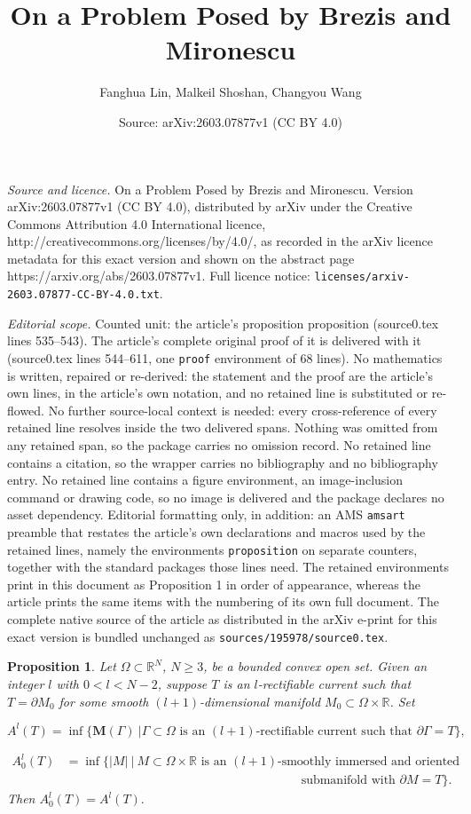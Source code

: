\documentclass[10pt,a4paper]{amsart}
\title{On a Problem Posed by Brezis and Mironescu}
\author{Fanghua Lin, Malkeil Shoshan, Changyou Wang}
\date{Source: arXiv:2603.07877v1 (CC BY 4.0)}
\newtheorem{proposition}{Proposition}
\newcommand{\R}{\mathbb{R}}
\begin{document}
\maketitle

\noindent\emph{Source and licence.} On a Problem Posed by Brezis and Mironescu. Version arXiv:2603.07877v1 (CC BY 4.0), distributed by arXiv under the Creative Commons Attribution 4.0 International licence, http://creativecommons.org/licenses/by/4.0/, as recorded in the arXiv licence metadata for this exact version and shown on the abstract page https://arxiv.org/abs/2603.07877v1. Full licence notice: \texttt{licenses/arxiv-2603.07877-CC-BY-4.0.txt}.\par\smallskip

\noindent\textit{Editorial scope.} Counted unit: the article's proposition proposition (source0.tex lines 535--543). The article's complete original proof of it is delivered with it (source0.tex lines 544--611, one \texttt{proof} environment of 68 lines). No mathematics is written, repaired or re-derived: the statement and the proof are the article's own lines, in the article's own notation, and no retained line is substituted or re-flowed.  No further source-local context is needed: every cross-reference of every retained line resolves inside the two delivered spans.  Nothing was omitted from any retained span, so the package carries no omission record.  No retained line contains a citation, so the wrapper carries no bibliography and no bibliography entry.  No retained line contains a figure environment, an image-inclusion command or drawing code, so no image is delivered and the package declares no asset dependency.  Editorial formatting only, in addition: an AMS \texttt{amsart} preamble that restates the article's own declarations and macros used by the retained lines, namely the environments \texttt{proposition} on separate counters, together with the standard packages those lines need.  The retained environments print in this document as Proposition 1 in order of appearance, whereas the article prints the same items with the numbering of its own full document.  The complete native source of the article as distributed in the arXiv e-print for this exact version is bundled unchanged as \texttt{sources/195978/source0.tex}.
\begin{proposition} {\it Let $\Omega \subset \mathbb{R}^N$, $N\geq 3$, be a bounded convex open set. Given an integer $l$ with $0 < l < N-2$, suppose $T$ is an $l$-rectifiable current such that $T = \partial M_0$ for some smooth $(l+1)$-dimensional manifold $M_0 \subset \Omega\times\R$. Set 

\[ A^l(T) = \inf \Big\{ \mathbf{M}(\Gamma)\ | \Gamma \subset \Omega \text{ is an } (l+1)\text{-rectifiable current such that } \partial \Gamma = T \Big\},\]

\begin{align*} A_0^l(T) &= \inf \Big\{ |M|\ |\ M\subset\Omega\times\R \text{ is an } (l+1)\text{-smoothly immersed and oriented}\\
&\qquad\qquad\qquad\qquad\qquad\qquad\qquad\qquad\qquad\quad \text{submanifold with } \partial M = T \Big\}.
\end{align*}
Then $A_0^l(T) = A^l(T).$}
\end{proposition}
\end{document}
